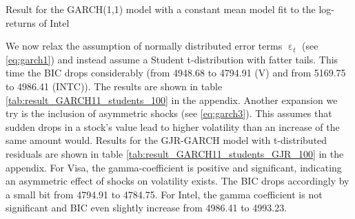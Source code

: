 \begin{table}[h!]
    \centering
    
    \caption{Result for the GARCH(1,1) model with a constant mean model fit to the log-returns of Intel}
    \label{tab:INTC_result_GARCH11_100}
\end{table}{}
We now relax the assumption of normally distributed error terms $\upepsilon_t$ (see \ref{eq:garch1}) and instead assume a Student t-distribution with fatter tails. This time the BIC drops considerably (from 4948.68 to 4794.91 (V) and from 5169.75 to 4986.41 (INTC)). The results are shown in table \ref{tab:result_GARCH11_students_100} in the appendix. 
%    
%    
Another expansion we try is the inclusion of asymmetric shocks (see \ref{eq:garch3}). This assumes that sudden drops in a stock's value lead to higher volatility than an increase of the same amount would. Results for the GJR-GARCH model with t-distributed residuals are shown in table \ref{tab:result_GARCH11_students_GJR_100} in the appendix. For Visa, the gamma-coefficient is positive and significant, indicating an asymmetric effect of shocks on volatility exists. The BIC drops accordingly by a small bit from 4794.91 to 4784.75. For Intel, the gamma coefficient is not significant and BIC even slightly increase from 4986.41 to 4993.23.

